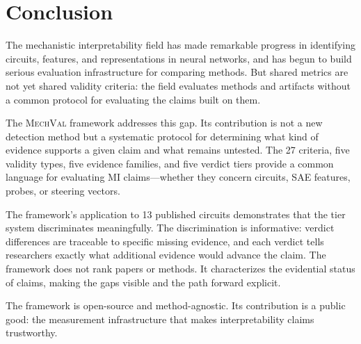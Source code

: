 \documentclass[10pt]{article}
\newcommand{\mechval}{\textsc{MechVal}}
\begin{document}
\section{Conclusion}
\label{sec:conclusion}

The mechanistic interpretability field has made remarkable progress in identifying circuits, features, and representations in neural networks, and has begun to build serious evaluation infrastructure for comparing methods. But shared metrics are not yet shared validity criteria: the field evaluates methods and artifacts without a common protocol for evaluating the claims built on them.

The \mechval{} framework addresses this gap. Its contribution is not a new detection method but a systematic protocol for determining what kind of evidence supports a given claim and what remains untested. The 27 criteria, five validity types, five evidence families, and five verdict tiers provide a common language for evaluating MI claims---whether they concern circuits, SAE features, probes, or steering vectors.

The framework's application to 13 published circuits demonstrates that the tier system discriminates meaningfully. The discrimination is informative: verdict differences are traceable to specific missing evidence, and each verdict tells researchers exactly what additional evidence would advance the claim. The framework does not rank papers or methods. It characterizes the evidential status of claims, making the gaps visible and the path forward explicit.

The framework is open-source and method-agnostic. Its contribution is a public good: the measurement infrastructure that makes interpretability claims trustworthy.

% 
% 

\end{document}
